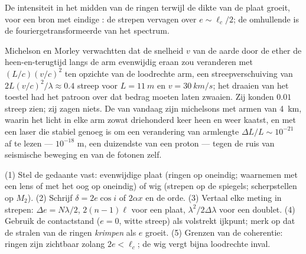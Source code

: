 \begin{omfigure}

{\small De intensiteit in het midden van de ringen terwijl de dikte van de plaat
groeit, voor een bron met eindige : de strepen vervagen over
$e \sim \ell_c/2$; de omhullende is de fouriergetransformeerde van het spectrum.}
\end{omfigure}

\begin{remark}\label{rem:b2:michelson:history}
Michelson en Morley verwachtten dat de snelheid $v$ van de aarde door de
ether de heen-en-terugtijd langs de arm evenwijdig eraan zou veranderen met
$(L/c)(v/c)^2$ ten opzichte van de loodrechte arm, een streepverschuiving van
$2L(v/c)^2/\lambda \approx 0.4$ streep voor $L = \qty{11}{m}$ en
$v = \qty{30}{km/s}$;
het draaien van het toestel had het patroon over dat bedrag moeten laten zwaaien.
Zij konden $0.01$ streep zien; zij zagen niets. De
 van vandaag zijn michelsons met armen van
\qty{4}{km}, waarin het licht
in elke arm zowat driehonderd keer heen en weer kaatst, en met een laser die
stabiel genoeg is om een
verandering van armlengte $\Delta L/L \sim 10^{-21}$ af te lezen ---
$10^{-18}$ m, een duizendste
van een proton --- tegen de ruis van seismische beweging en van de fotonen
zelf.
\end{remark}

\begin{method}\label{met:b2:michelson:method}
(1) Stel de gedaante vast: evenwijdige plaat (ringen op oneindig;
waarnemen met een lens of met het oog op oneindig) of wig (strepen op de
spiegels; scherpstellen op $M_2$). (2) Schrijf $\delta = 2e\cos i$ of
$2\alpha x$ en de
orde. (3) Vertaal elke meting in strepen: $\Delta e = N\lambda/2$,
$2(n - 1)\ell$ voor een plaat, $\lambda^2/2\Delta\lambda$ voor een doublet.
(4) Gebruik de
contactstand ($e = 0$, witte streep) als volstrekt ijkpunt;
merk op dat de stralen van de ringen \emph{krimpen} als $e$ groeit. (5) Grenzen
van de coherentie: ringen zijn zichtbaar zolang $2e < \ell_c$; de wig vergt
bijna loodrechte inval.
\end{method}

